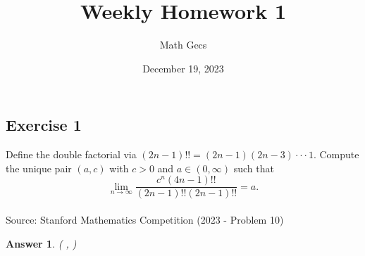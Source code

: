 \documentclass[12pt]{article}
\title{Weekly Homework 1}
\author{Math Gecs}
\date{December 19, 2023}
\newtheorem{answer}{Answer}
\begin{document}
\maketitle

\subsection*{Exercise 1}
Define the double factorial via $(2n-1)!!=(2n-1)(2n-3) \cdot \cdot \cdot 1$. Compute the unique pair $(a,c)$ with $c > 0$ and $a \in (0,\infty)$ such that\\

\[
\lim_{n \to \infty} \frac{c^n (4n - 1)!!}{(2n - 1)!! (2n - 1)!!} = a.
\]\\

Source: Stanford Mathematics Competition (2023 - Problem 10)

\begin{answer} \left( ,  \right)
\end{answer}
\end{document}

